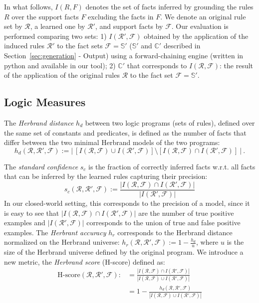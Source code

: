 \documentclass[letterpaper]{article} \usepackage{aaai20}  \usepackage{times}  \usepackage{helvet} \usepackage{courier}  \usepackage[hyphens]{url}  \usepackage{graphicx} \urlstyle{rm} \def\UrlFont{\rm}  \usepackage{graphicx}  \frenchspacing  \setlength{\pdfpagewidth}{8.5in}  \setlength{\pdfpageheight}{11in}  \usepackage{amsthm}
\theoremstyle{definition}
\newcommand{\sfacts}{\ensuremath{\mathbb{S}}\xspace}
\newcommand{\cfacts}{\ensuremath{\mathbb{C}}\xspace}
\begin{document}
In what follows, $I(R,F)$ denotes the set of facts inferred by grounding the rules $R$ over the support facts $F$ excluding the facts in $F$.
We denote an original rule set by $\mathcal{R}$, a learned one by $\mathcal{R}'$, and  support facts by $\mathcal{F}$.
Our evaluation is performed comparing two sets: 
1) $I(\mathcal{R}',\mathcal{F})$ obtained by the application of the induced rules $\mathcal{R}'$ to the fact sets $\mathcal{F}=\sfacts'$ ($\sfacts'$ and $\cfacts'$ described in Section~\ref{sec:generation} - Output) using a forward-chaining engine (written in python and available in our tool);
2) $\cfacts'$ that corresponds to $I(\mathcal{R},\mathcal{F})$: the result of the application of the original rules $\mathcal{R}$ to the fact set $\mathcal{F}=\sfacts'$.


\subsection{Logic Measures}
The \emph{Herbrand distance} $h_d$ between two logic programs (sets of rules), defined over the same set of constants and predicates, is defined as the number of facts that differ between the two minimal Herbrand models of the two programs: 
$$
h_d(\mathcal{R},\mathcal{R}',\mathcal{F}):= 
|~
[I(\mathcal{R},\mathcal{F}) \cup I(\mathcal{R}',\mathcal{F})]
\setminus 
[I(\mathcal{R},\mathcal{F}) \cap I(\mathcal{R}',\mathcal{F})]
~ | ~.
$$

The \emph{standard confidence} $s_c$ \cite{Galarraga+-VLDBJ15:amiep} 
is the fraction of correctly inferred facts w.r.t. all facts that can be inferred by the learned rules capturing their precision: 
$$s_c(\mathcal{R},\mathcal{R}',\mathcal{F})
:= \frac{|I(\mathcal{R},\mathcal{F})\cap I(\mathcal{R}',\mathcal{F})|}{|I(\mathcal{R}',\mathcal{F})|} $$
In our closed-world setting, this corresponds to the precision of a model, since it is easy to see that  $ |I(\mathcal{R},\mathcal{F})\cap I(\mathcal{R}',\mathcal{F})|$  are the number of true positive examples and $|I(\mathcal{R}',\mathcal{F})|$ corresponds to the union of true and false positive examples.
The {\it Herbrant accuracy}  $h_r$ corresponds to the Herbrand distance normalized on the Herbrand universe: $h_r(\mathcal{R},\mathcal{R}',\mathcal{F}):= 1- \frac{h_d}{u}$, where $u$ is the size of the Herbrand universe defined by the original program.
We introduce a new metric, the \emph{Herbrand score} (H-score) defined as:
\begin{align*}
\text{H-score}(\mathcal{R},\mathcal{R}',\mathcal{F}):&= \frac{|I(\mathcal{R},\mathcal{F})\cap I(\mathcal{R}',\mathcal{F})|}{|I(\mathcal{R},\mathcal{F})\cup I(\mathcal{R}',\mathcal{F})|} \\
&= 1- \frac{h_d(\mathcal{R},\mathcal{R}',\mathcal{F})}{|I(\mathcal{R},\mathcal{F})\cup I(\mathcal{R}',\mathcal{F})|} 
\end{align*}
\end{document}

